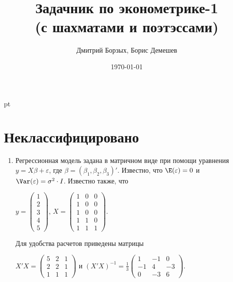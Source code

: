 \documentclass[pdftex,12pt,a4paper]{article}
\title{Задачник по эконометрике-1 \\ {\small (с шахматами и поэтэссами)}}
\author{Дмитрий Борзых, Борис Демешев}
\date{\today}
\begin{document}
\maketitle %


 pt %

\section{Неклассифицировано}

\begin{enumerate}
\item Регрессионная модель  задана в матричном виде при помощи уравнения $y=X\beta+\varepsilon$, где $\beta=(\beta_1,\beta_2,\beta_3)'$.
Известно, что $\E(\varepsilon)=0$  и  $\Var(\varepsilon)=\sigma^2\cdot I$.
Известно также, что 

$y=\left(
\begin{array}{c} 
1\\ 
2\\ 
3\\ 
4\\ 
5
\end{array}\right)$, 
$X=\left(\begin{array}{ccc}
1 & 0 & 0 \\
1 & 0 & 0 \\
1 & 0 & 0 \\
1 & 1 & 0 \\
1 & 1 & 1 
\end{array}\right)$.


Для удобства расчетов приведены матрицы 


$X'X=\left(
\begin{array}{ccc} 
5 & 2 & 1\\ 
2 & 2 & 1\\ 
1 & 1 & 1 
\end{array}\right)$ и $(X'X)^{-1}=\frac{1}{3}\left(
\begin{array}{ccc} 
1 & -1 & 0 \\
-1 & 4 & -3 \\
0 & -3 & 6
\end{array}\right)$.


\end{enumerate}
\end{document}
